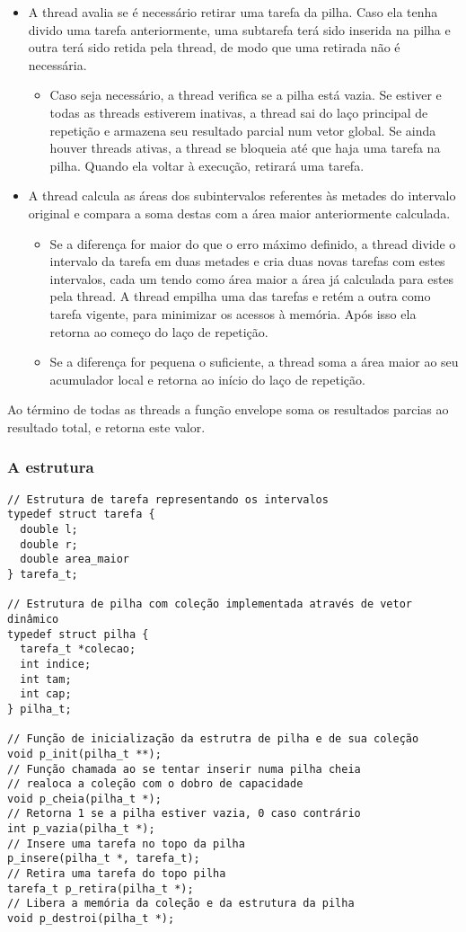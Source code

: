 \documentclass[11pt]{article}
\begin{document}
\begin{itemize}
\item A thread avalia se é necessário retirar uma tarefa da pilha. Caso ela tenha divido uma tarefa
anteriormente, uma subtarefa terá sido inserida na pilha e outra terá sido retida pela thread,
de modo que uma retirada não é necessária.
\begin{itemize}
\item Caso seja necessário, a thread verifica se a pilha está vazia. Se estiver e todas as threads
estiverem inativas, a thread sai do laço principal de repetição e armazena seu resultado
parcial num vetor global. Se ainda houver threads ativas, a thread se bloqueia até que haja
uma tarefa na pilha. Quando ela voltar à execução, retirará uma tarefa.
\end{itemize}
\item A thread calcula as áreas dos subintervalos referentes às metades do intervalo original
e compara a soma destas com a área maior anteriormente calculada. 
\begin{itemize}
\item Se a diferença for maior do que o erro máximo definido, a thread divide o intervalo da tarefa
em duas metades e cria duas novas tarefas com estes intervalos, cada um tendo como área maior
a área já calculada para estes pela thread. A thread empilha uma das tarefas e retém a outra
como tarefa vigente, para minimizar os acessos à memória. Após isso ela retorna ao começo
do laço de repetição.
\item Se a diferença for pequena o suficiente, a thread soma a área maior ao seu acumulador local
e retorna ao início do laço de repetição.
\end{itemize}
\end{itemize}

Ao término de todas as threads a função envelope soma os resultados parcias ao resultado total, e
retorna este valor.

\subsubsection{A estrutura}
\label{sec:org16993ef}
\begin{verbatim}
// Estrutura de tarefa representando os intervalos
typedef struct tarefa {
  double l;
  double r;
  double area_maior
} tarefa_t;

// Estrutura de pilha com coleção implementada através de vetor dinâmico
typedef struct pilha {
  tarefa_t *colecao;
  int indice;
  int tam;
  int cap;
} pilha_t;

// Função de inicialização da estrutra de pilha e de sua coleção
void p_init(pilha_t **);
// Função chamada ao se tentar inserir numa pilha cheia
// realoca a coleção com o dobro de capacidade
void p_cheia(pilha_t *);
// Retorna 1 se a pilha estiver vazia, 0 caso contrário
int p_vazia(pilha_t *);
// Insere uma tarefa no topo da pilha
p_insere(pilha_t *, tarefa_t);
// Retira uma tarefa do topo pilha
tarefa_t p_retira(pilha_t *);
// Libera a memória da coleção e da estrutura da pilha
void p_destroi(pilha_t *);
\end{verbatim}
\end{document}
